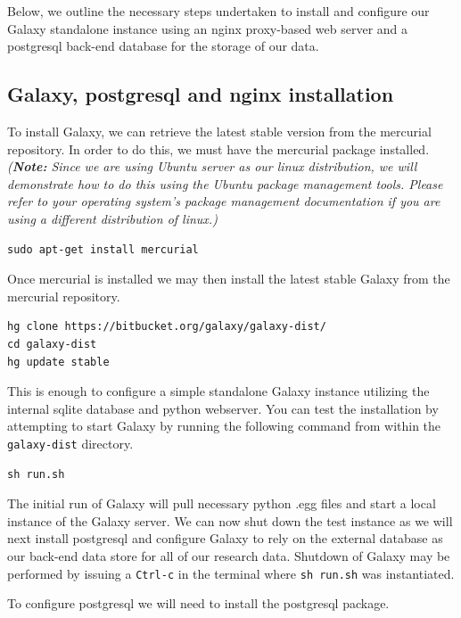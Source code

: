 \documentclass[a4paper,10pt]{article}
\begin{document}
Below, we outline the necessary steps undertaken to install and configure our Galaxy standalone instance using an nginx proxy-based web server and a postgresql back-end database for the storage of our data.

\subsection{Galaxy, postgresql and nginx installation}
To install Galaxy, we can retrieve the latest stable version from the mercurial repository.  In order to do this, we must have the mercurial package installed.  \textit{(\textbf{Note:} Since we are using Ubuntu server as our linux distribution, we will demonstrate how to do this using the Ubuntu package management tools.  Please refer to your operating system's package management documentation if you are using a different distribution of linux.)}

\begin{lstlisting}
sudo apt-get install mercurial
\end{lstlisting}

Once mercurial is installed we may then install the latest stable Galaxy from the mercurial repository.

\begin{lstlisting}
hg clone https://bitbucket.org/galaxy/galaxy-dist/
cd galaxy-dist
hg update stable
\end{lstlisting}

This is enough to configure a simple standalone Galaxy instance utilizing the internal sqlite database and python webserver.  You can test the installation by attempting to start Galaxy by running the following command from within the \texttt{\footnotesize{galaxy-dist}} directory.

\begin{lstlisting}
sh run.sh
\end{lstlisting}

The initial run of Galaxy will pull necessary python .egg files and start a local instance of the Galaxy server.  We can now shut down the test instance as we will next install postgresql and configure Galaxy to rely on the external database as our back-end data store for all of our research data.  Shutdown of Galaxy may be performed by issuing a \texttt{\footnotesize{Ctrl-c}} in the terminal where \texttt{\footnotesize{sh run.sh}} was instantiated.

To configure postgresql we will need to install the postgresql package.
\end{document}
